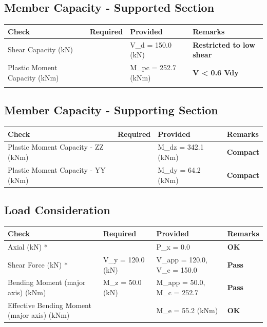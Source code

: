 \documentclass{article}%
\begin{document}
%
%
\subsection{Member Capacity {-} Supported Section}%
\label{subsec:MemberCapacity{-}SupportedSection}%
\renewcommand{\arraystretch}{1.2}%
\begin{longtable}{|p{4.5cm}|p{3cm}|p{6.5cm}|p{1.5cm}|}%
\hline%
\rowcolor{OsdagGreen}%
Check&Required&Provided&Remarks\\%
\hline%
\endhead%
\hline%
Shear Capacity (kN)&&V\_d = 150.0 (kN)&\textcolor{OsdagGreen}{%
\textbf{Restricted to low shear}%
}\\%
\hline%
Plastic Moment Capacity (kNm)&&M\_pc = 252.7 (kNm)&\textcolor{OsdagGreen}{%
\textbf{V < 0.6 Vdy}%
}\\%
\hline%
&&&\textcolor{OsdagGreen}{%
\textbf{}%
}\\%
\hline%
\end{longtable}

%
%
\subsection{Member Capacity {-} Supporting Section}%
\label{subsec:MemberCapacity{-}SupportingSection}%
\renewcommand{\arraystretch}{1.2}%
\begin{longtable}{|p{4.5cm}|p{3cm}|p{6.5cm}|p{1.5cm}|}%
\hline%
\rowcolor{OsdagGreen}%
Check&Required&Provided&Remarks\\%
\hline%
\endhead%
\hline%
Plastic Moment Capacity - ZZ (kNm)&&M\_dz = 342.1 (kNm)&\textcolor{OsdagGreen}{%
\textbf{Compact}%
}\\%
\hline%
Plastic Moment Capacity - YY (kNm)&&M\_dy = 64.2 (kNm)&\textcolor{OsdagGreen}{%
\textbf{Compact}%
}\\%
\hline%
\end{longtable}

%
%
\subsection{Load Consideration}%
\label{subsec:LoadConsideration}%
\renewcommand{\arraystretch}{1.2}%
\begin{longtable}{|p{3.5cm}|p{5.3cm}|p{5.2cm}|p{1.5cm}|}%
\hline%
\rowcolor{OsdagGreen}%
Check&Required&Provided&Remarks\\%
\hline%
\endhead%
\hline%
Axial (kN) *&&P\_x = 0.0&\textcolor{OsdagGreen}{%
\textbf{OK}%
}\\%
\hline%
Shear Force (kN) *&V\_y = 120.0 (kN)&V\_app = 120.0, V\_c = 150.0&\textcolor{OsdagGreen}{%
\textbf{Pass}%
}\\%
\hline%
Bending Moment (major axis) (kNm)&M\_z = 50.0 (kN)&M\_app = 50.0, M\_c = 252.7&\textcolor{OsdagGreen}{%
\textbf{Pass}%
}\\%
\hline%
Effective Bending Moment (major axis) (kNm)&&M\_e = 55.2 (kNm)&\textcolor{OsdagGreen}{%
\textbf{OK}%
}\\%
\hline%
\end{longtable}
\end{document}
